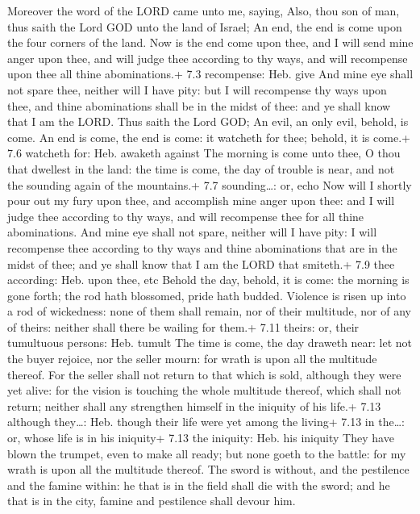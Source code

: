  Moreover the word of the LORD came unto me, saying,
 Also, thou son of man, thus saith the Lord GOD unto the
land of Israel; An end, the end is come upon the four corners of the
land.  Now is the end come upon thee, and I will send mine
anger upon thee, and will judge thee according to thy ways, and will
recompense upon thee all thine abominations.+ 7.3 recompense: Heb. give
 And mine eye shall not spare thee, neither will I have
pity: but I will recompense thy ways upon thee, and thine abominations
shall be in the midst of thee: and ye shall know that I am the LORD.
 Thus saith the Lord GOD; An evil, an only evil, behold, is
come.  An end is come, the end is come: it watcheth for
thee; behold, it is come.+ 7.6 watcheth for: Heb. awaketh against
 The morning is come unto thee, O thou that dwellest in the
land: the time is come, the day of trouble is near, and not the sounding
again of the mountains.+ 7.7 sounding\ldots: or, echo  Now
will I shortly pour out my fury upon thee, and accomplish mine anger
upon thee: and I will judge thee according to thy ways, and will
recompense thee for all thine abominations.  And mine eye
shall not spare, neither will I have pity: I will recompense thee
according to thy ways and thine abominations that are in the midst of
thee; and ye shall know that I am the LORD that smiteth.+ 7.9 thee
according: Heb. upon thee, etc  Behold the day, behold, it
is come: the morning is gone forth; the rod hath blossomed, pride hath
budded.  Violence is risen up into a rod of wickedness:
none of them shall remain, nor of their multitude, nor of any of theirs:
neither shall there be wailing for them.+ 7.11 theirs: or, their
tumultuous persons: Heb. tumult  The time is come, the day
draweth near: let not the buyer rejoice, nor the seller mourn: for wrath
is upon all the multitude thereof.  For the seller shall
not return to that which is sold, although they were yet alive: for the
vision is touching the whole multitude thereof, which shall not return;
neither shall any strengthen himself in the iniquity of his life.+ 7.13
although they\ldots: Heb. though their life were yet among the living+
7.13 in the\ldots: or, whose life is in his iniquity+ 7.13 the iniquity:
Heb. his iniquity  They have blown the trumpet, even to
make all ready; but none goeth to the battle: for my wrath is upon all
the multitude thereof.  The sword is without, and the
pestilence and the famine within: he that is in the field shall die with
the sword; and he that is in the city, famine and pestilence shall
devour him.

